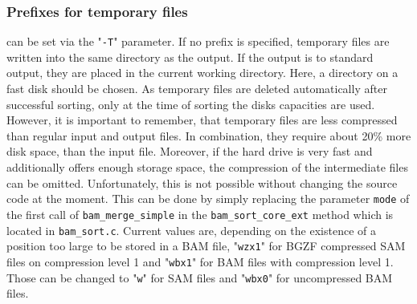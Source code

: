 \subsubsection{Prefixes for temporary files} can be set via the "\texttt{-T}" parameter. If no prefix is specified, temporary files are written into the same directory as the output. If the output is to standard output, they are placed in the current working directory. Here, a directory on a fast disk should be chosen. As temporary files are deleted automatically after successful sorting, only at the time of sorting the disks capacities are used. However, it is important to remember, that temporary files are less compressed than regular input and output files. In combination, they require about 20\% more disk space, than the input file. Moreover, if the hard drive is very fast and additionally offers enough storage space, the compression of the intermediate files can be omitted. Unfortunately, this is not possible without changing the source code at the moment. This can be done by simply replacing the parameter \texttt{mode} of the first call of \texttt{bam\_merge\_simple} in the \texttt{bam\_sort\_core\_ext} method which is located in \texttt{bam\_sort.c}. Current values are, depending on the existence of a position too large to be stored in a BAM file, "\texttt{wzx1}" for BGZF compressed SAM files on compression level 1 and "\texttt{wbx1}" for BAM files with compression level 1. Those can be changed to "\texttt{w}" for SAM files and "\texttt{wbx0}" for uncompressed BAM files.